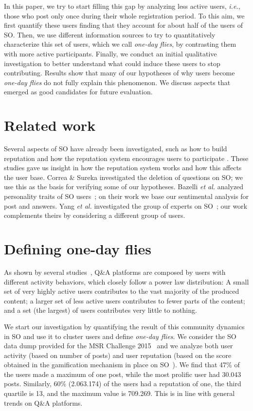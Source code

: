 \documentclass[conference]{IEEEtran}
\newcommand{\ie}{\emph{i.e.},\xspace}
\newcommand{\etal}{\emph{et al.}\xspace}
\newcommand\odf{\emph{one-day flies}\xspace}
\begin{document}
In this paper, we try to start filling this gap by analyzing less active users,
\ie those who post only once during their whole registration period.  To this
aim, we first quantify these users finding that they account for about half of
the users of SO. Then, we use different information sources to try to
quantitatively characterize this set of users, which we call \odf, by
contrasting them with more active participants.  Finally, we conduct an initial
qualitative investigation to better understand what could induce these users to
stop contributing.  Results show that many of our hypotheses of why users
become \odf do not fully explain this phenomenon. We discuss aspects that
emerged as good candidates for future evaluation.



\section{Related work}

Several aspects of SO have already been investigated, such as how to
build reputation \cite{bosu2013building} and how the reputation system
encourages users to participate \cite{movshovitz2013analysis}. These studies 
gave us insight in how the reputation system works and how this affects the user
base. 
Correa \& Sureka \cite{correa2014chaff} investigated the deletion of
questions on SO; we use this as the basis for verifying some of our hypotheses.
Bazelli \etal analyzed personality traits of SO
users~\cite{bazelli2013personality}; on their work we base our sentimental
analysis for post and answers. 
Yang \etal investigated the group of experts on
SO~\cite{yang2014sparrows}; our work complements theirs by considering a
different group of users.


\section{Defining one-day flies}

As shown by several studies~\cite{yang2014sparrows}, Q\&A platforms are
composed by users with different activity behaviors, which closely follow a
power law distribution: A small set of very highly active users contributes
to the vast majority of the produced content; a larger set of less active users
contributes to fewer parts of the content; and a set (the largest) of users
contributes very little to nothing.

We start our investigation by quantifying the result of this community dynamics
in SO and use it to cluster users and define \odf. We consider the SO data dump
provided for the MSR Challenge 2015~\cite{MSRChallenge2015} and we analyze both
user activity (based on number of posts) and user reputation (based on the
score obtained in the gamification mechanism in place on
SO~\cite{anderson2013steering}).  We find that 47\% of the users made a maximum
of one post, while the most prolific user had 30.043 posts. Similarly, 60\%
(2.063.174) of the users had a reputation of one, the third quartile is 13, and
the maximum value is 709.269.  This is in line with general trends on Q\&A
platforms.
\end{document}
